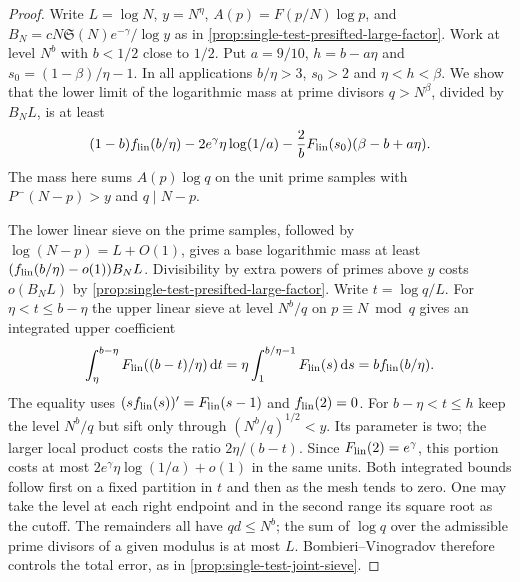 \documentclass[11pt,a4paper]{article}
\numberwithin{equation}{section}
\newcommand{\SSS}{\mathfrak S}
\newcommand{\ud}{\mathrm d}
\begin{document}
\begin{proof}
Write $L=\log N$, $y=N^\eta$, $A(p)=F(p/N)\log p$, and
$B_N=cN\SSS(N)e^{-\gamma}/\log y$ as in
\cref{prop:single-test-presifted-large-factor}. Work at level $N^b$
with $b<1/2$ close to $1/2$. Put $a=9/10$, $h=b-a\eta$ and
$s_0=(1-\beta)/\eta-1$. In all applications $b/\eta>3$,
$s_0>2$ and $\eta<h<\beta$. We show that the lower limit of
the logarithmic mass at prime divisors $q>N^\beta$, divided by
$B_NL$, is at least
\begin{equation}
 (1-b) f_{\rm lin}(b/\eta)
 -2e^\gamma\eta\log(1/a)
 -\frac{2}{b} F_{\rm lin}(s_0)(\beta-b+a\eta).
 \label{eq:single-test-switched-log-budget}
\end{equation}
The mass here sums $A(p)\log q$ on the unit prime samples with
$P^-(N-p)>y$ and $q\mid N-p$.

The lower linear sieve on the prime samples, followed by
$\log(N-p)=L+O(1)$, gives a base logarithmic mass at least
$(f_{\rm lin}(b/\eta)-o(1))B_N L$. Divisibility by extra
powers of primes above $y$ costs $o(B_N L)$ by
\cref{prop:single-test-presifted-large-factor}. Write $t=\log q/L$.
For $\eta<t\le b-\eta$ the upper linear sieve at level $N^b/q$
on $p\equiv N\bmod q$ gives an integrated upper coefficient
\[
 \int_\eta^{b-\eta}F_{\rm lin}((b-t)/\eta)\,\ud t
   =\eta\int_1^{b/\eta-1}F_{\rm lin}(s)\,\ud s
   = b f_{\rm lin}(b/\eta).
\]
The equality uses $(s f_{\rm lin}(s))'=F_{\rm lin}(s-1)$ and
$f_{\rm lin}(2)=0$. For $b-\eta<t\le h$ keep the level $N^b/q$
but sift only through $(N^b/q)^{1/2}<y$. Its parameter is two;
the larger local product costs the ratio $2\eta/(b-t)$.
Since $F_{\rm lin}(2)=e^\gamma$, this portion costs at most
$2e^\gamma\eta\log(1/a)+o(1)$ in the same units. Both integrated
bounds follow first on a fixed partition in $t$ and then as the
mesh tends to zero. One may take the level at each right endpoint
and in the second range its square root as the cutoff. The
remainders all have $qd\le N^b$; the sum of $\log q$ over the
admissible prime divisors of a given modulus is at most $L$.
Bombieri--Vinogradov therefore controls the total error, as in
\cref{prop:single-test-joint-sieve}.


\end{proof}
\end{document}
